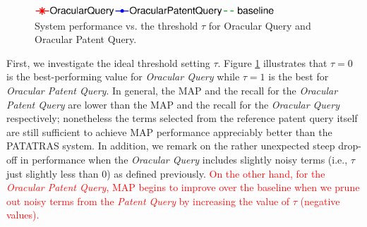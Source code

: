 \begin{figure}[t!]
\begin{centering}
\includegraphics[width=9cm]{imgs/l1}
\par\end{centering}

\begin{centering}
\par\end{centering}

\protect\caption{System performance vs. the threshold $\tau$ for Oracular Query and Oracular Patent Query.}
\label{fig:oracular}
\end{figure}

First, we investigate the ideal threshold setting $\tau$.
Figure \ref{fig:oracular} illustrates that $\tau=0$ is the
best-performing value for \emph{Oracular Query} while $\tau=1$ is the
best for \emph{Oracular Patent Query}. In general, the MAP and the recall for the \emph{Oracular
Patent Query} are lower than the MAP and the recall for the \emph{Oracular Query} respectively;
nonetheless the terms selected from the reference patent query itself are
still sufficient to achieve MAP performance appreciably better than the PATATRAS system. In addition, we remark on the rather
unexpected steep drop-off in performance when the \emph{Oracular Query}
includes slightly noisy terms (i.e., $\tau$ just slightly less than 0)
as defined previously. \textcolor{red}{On the other hand, for the \emph{Oracular Patent Query}, 
MAP begins to improve over the baseline when we prune out noisy terms from the \emph{Patent Query} by increasing the value of $\tau$ (negative values).}

